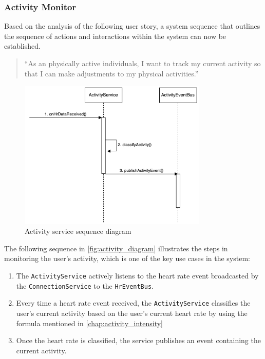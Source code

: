 \subsubsection{Activity Monitor}
\label{chap:activity_monitor_design}
Based on the analysis of the following user story, a system sequence that outlines the sequence of actions and interactions within the system can now be established.
\begin{quotation}
    \enquote{As an physically active individuals, I want to track my current activity so that I can make adjustments to my physical activities.} 
\end{quotation}

\begin{figure}[H]
    \centering
    \includegraphics[width=0.8\textwidth]{diagrams/activity-monitor-seq.drawio.png}
    \caption{Activity service sequence diagram}
    \label{fig:activity_diagram}
\end{figure}

The following sequence in \autoref{fig:activity_diagram} illustrates the steps in monitoring the user's activity, which is one of the key use cases in the system:
\begin{enumerate}
    \item The \texttt{ActivityService} actively listens to the heart rate event broadcasted by the \texttt{ConnectionService} to the \texttt{HrEventBus}.
    \item Every time a heart rate event received, the \texttt{ActivityService} classifies the user's current activity based on the user's current heart rate by using the formula mentioned in \autoref{chap:activity_intensity}
    \item Once the heart rate is classified, the service publishes an event containing the current activity.
\end{enumerate}


